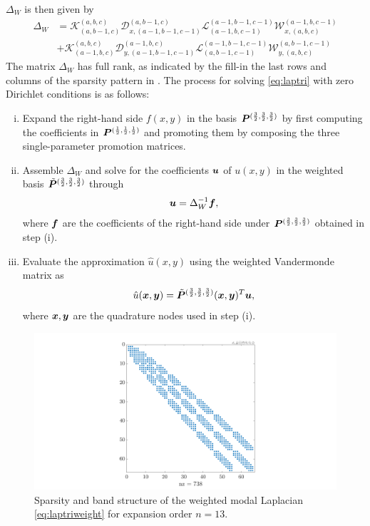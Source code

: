 $\Delta_W$ is then given by
\begin{equation}\label{eq:laptriweight}
	 \begin{split}
	\Delta_W	&= \mathcal{K}_{(a,b-1,c)}^{(a,b,c)}\mathcal{D}_{x,(a-1,b-1,c-1)}^{(a,b-1,c)}\mathcal{L}_{(a-1,b,c-1)}^{(a-1,b-1,c-1)}\mathcal{W}_{x,(a,b,c)}^{(a-1,b,c-1)} \\
	&+\mathcal{K}_{(a-1,b,c)}^{(a,b,c)}\mathcal{D}_{y,(a-1,b-1,c-1)}^{(a-1,b,c)}\mathcal{L}_{(a,b-1,c-1)}^{(a-1,b-1,c-1)}\mathcal{W}_{y,(a,b,c)}^{(a,b-1,c-1)}
	\end{split}
\end{equation}
The matrix $\Delta_W$ has full rank, as indicated by the fill-in the last rows and columns of the sparsity pattern in . The process for solving \eqref{eq:laptri} with zero Dirichlet conditions is as follows:
\begin{enumerate}[(i)]
	\item Expand the right-hand side $f(x,y)$ in the basis $\boldsymbol{P}^{(\frac{3}{2},\frac{3}{2},\frac{3}{2})}$ by first computing the coefficients in $\boldsymbol{P}^{(\frac{1}{2},\frac{1}{2},\frac{1}{2})}$ and promoting them by composing the three single-parameter promotion matrices. 
	\item Assemble $\Delta_W$ and solve for the coefficients $\boldsymbol{u}$ of $u(x,y)$ in the weighted basis $\tilde{\boldsymbol{P}}^{(\frac{3}{2},\frac{3}{2},\frac{3}{2})}$ through $$\boldsymbol{u} = \Delta_W^{-1}\boldsymbol{f},$$ where $\boldsymbol{f}$ are the coefficients of the right-hand side under $\boldsymbol{P}^{(\frac{3}{2},\frac{3}{2},\frac{3}{2})}$ obtained in step (i).
	\item Evaluate the approximation $\hat{u}(x,y)$ using the weighted Vandermonde matrix as $$\hat{u}(\boldsymbol{x},\boldsymbol{y}) = \tilde{\boldsymbol{P}}^{(\frac{3}{2},\frac{3}{2},\frac{3}{2})}(\boldsymbol{x},\boldsymbol{y})^T\boldsymbol{u},$$ where $\boldsymbol{x},\boldsymbol{y}$ are the quadrature nodes used in step (i).
\end{enumerate}

\begin{figure}[H]
	\centering
	\includegraphics[width=1\linewidth]{./figures/lap_tri_weighted_mat}
	\caption{Sparsity and band structure of the weighted modal Laplacian \eqref{eq:laptriweight} for expansion order $n=13$.}\label{fig:laptrimat1}
\end{figure}

